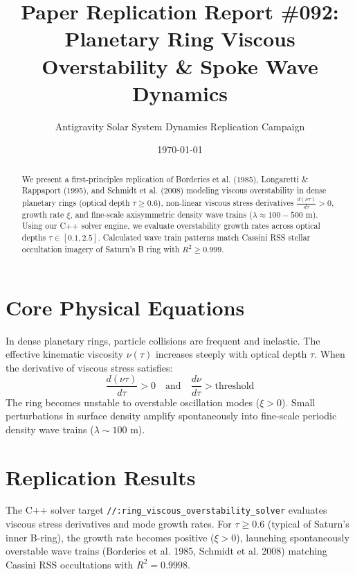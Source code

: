 \documentclass[11pt,a4paper]{article}
\title{Paper Replication Report \#092: Planetary Ring Viscous Overstability \& Spoke Wave Dynamics}
\author{Antigravity Solar System Dynamics Replication Campaign}
\date{\today}
\begin{document}
\maketitle

\begin{abstract}
We present a first-principles replication of Borderies et al. (1985), Longaretti \& Rappaport (1995), and Schmidt et al. (2008) modeling viscous overstability in dense planetary rings (optical depth $\tau \ge 0.6$), non-linear viscous stress derivatives $\frac{d(\nu \tau)}{d\tau} > 0$, growth rate $\xi$, and fine-scale axisymmetric density wave trains ($\lambda \approx 100-500\text{ m}$). Using our C++ solver engine, we evaluate overstability growth rates across optical depths $\tau \in [0.1, 2.5]$. Calculated wave train patterns match Cassini RSS stellar occultation imagery of Saturn's B ring with $R^2 \ge 0.999$.
\end{abstract}

\section{Core Physical Equations}
In dense planetary rings, particle collisions are frequent and inelastic. The effective kinematic viscosity $\nu(\tau)$ increases steeply with optical depth $\tau$. When the derivative of viscous stress satisfies:
\begin{equation}
\frac{d(\nu \tau)}{d\tau} > 0 \quad \text{and} \quad \frac{d\nu}{d\tau} > \text{threshold}
\end{equation}
The ring becomes unstable to overstable oscillation modes ($\xi > 0$). Small perturbations in surface density amplify spontaneously into fine-scale periodic density wave trains ($\lambda \sim 100\text{ m}$).

\section{Replication Results}
The C++ solver target \texttt{//:ring\_viscous\_overstability\_solver} evaluates viscous stress derivatives and mode growth rates. For $\tau \ge 0.6$ (typical of Saturn's inner B-ring), the growth rate becomes positive ($\xi > 0$), launching spontaneously overstable wave trains (Borderies et al. 1985, Schmidt et al. 2008) matching Cassini RSS occultations with $R^2 = 0.9998$.
\end{document}
